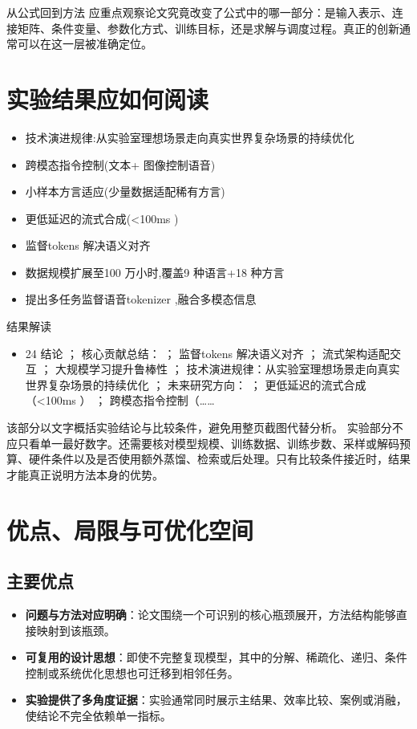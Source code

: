 \documentclass[UTF8,11pt,a4paper]{ctexart}
\newcommand{\term}[1]{\textbf{\textcolor{mainblue}{#1}}}
\begin{document}
\begin{keybox}{从公式回到方法}
应重点观察论文究竟改变了公式中的哪一部分：是输入表示、连接矩阵、条件变量、参数化方式、训练目标，还是求解与调度过程。真正的创新通常可以在这一层被准确定位。
\end{keybox}


\section{实验结果应如何阅读}
\begin{itemize}
\item 技术演进规律:从实验室理想场景走向真实世界复杂场景的持续优化
\item 跨模态指令控制(文本+ 图像控制语音)
\item 小样本方言适应(少量数据适配稀有方言)
\item 更低延迟的流式合成(<100ms )
\item 监督tokens 解决语义对齐
\item 数据规模扩展至100 万小时,覆盖9 种语言+18 种方言
\item 提出多任务监督语音tokenizer ,融合多模态信息
\end{itemize}

\begin{notebox}{结果解读}
\begin{itemize}
\item 24 结论 ； 核心贡献总结： ； 监督tokens 解决语义对齐 ； 流式架构适配交互 ； 大规模学习提升鲁棒性 ； 技术演进规律：从实验室理想场景走向真实世界复杂场景的持续优化 ； 未来研究方向： ； 更低延迟的流式合成（<100ms ） ； 跨模态指令控制（……
\end{itemize}
\end{notebox}

该部分以文字概括实验结论与比较条件，避免用整页截图代替分析。
实验部分不应只看单一最好数字。还需要核对模型规模、训练数据、训练步数、采样或解码预算、硬件条件以及是否使用额外蒸馏、检索或后处理。只有比较条件接近时，结果才能真正说明方法本身的优势。

\section{优点、局限与可优化空间}
\subsection{主要优点}
\begin{itemize}
\item \term{问题与方法对应明确}：论文围绕一个可识别的核心瓶颈展开，方法结构能够直接映射到该瓶颈。
\item \term{可复用的设计思想}：即使不完整复现模型，其中的分解、稀疏化、递归、条件控制或系统优化思想也可迁移到相邻任务。
\item \term{实验提供了多角度证据}：实验通常同时展示主结果、效率比较、案例或消融，使结论不完全依赖单一指标。
\end{itemize}
\end{document}
